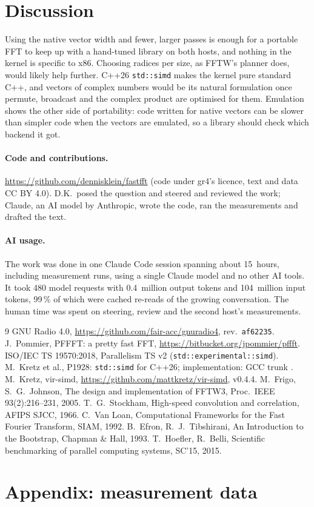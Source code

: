 \documentclass[10pt,a4paper,twocolumn]{article}
\newcommand{\code}[1]{\texttt{#1}}
\begin{document}
\section{Discussion}
Using the native vector width and fewer, larger passes is enough for a portable FFT to keep up with a hand-tuned
library on both hosts, and nothing in the kernel is specific to x86. Choosing radices per size, as FFTW's planner
does, would likely help further. C++26 \code{std::simd} makes the kernel pure standard C++, and vectors of complex
numbers would be its natural formulation once permute, broadcast and the complex product are optimised for them.
Emulation shows the other side of portability: code written for native vectors can be slower than simpler code when
the vectors are emulated, so a library should check which backend it got.

\paragraph{Code and contributions.} \url{https://github.com/dennisklein/fastfft} (code under gr4's licence,
text and data CC BY 4.0). D.K.\ posed the question and steered and reviewed the work; Claude, an AI model by
Anthropic, wrote the code, ran the measurements and drafted the text.

\paragraph{AI usage.} The work was done in one Claude Code session spanning about 15~hours, including measurement runs,
using a single Claude model and no other AI tools. It took 480 model requests with 0.4~million output tokens and
104~million input tokens, 99\,\% of which were cached re-reads of the growing conversation. The human time was spent
on steering, review and the second host's measurements.

\begin{thebibliography}{9}\setlength\itemsep{0pt}\small
{} GNU Radio 4.0, \url{https://github.com/fair-acc/gnuradio4}, rev.\ \code{af62235}.
 J.~Pommier, PFFFT: a pretty fast FFT, \url{https://bitbucket.org/jpommier/pffft}.
 ISO/IEC TS 19570:2018, Parallelism TS v2 (\code{std::experimental::simd}).
 M.~Kretz et al., P1928: \code{std::simd} for C++26; implementation: GCC trunk \code{\TrunkCommit}.
 M.~Kretz, vir-simd, \url{https://github.com/mattkretz/vir-simd}, v0.4.4.
 M.~Frigo, S.~G.~Johnson, The design and implementation of FFTW3, Proc.\ IEEE 93(2):216--231, 2005.
 T.~G.~Stockham, High-speed convolution and correlation, AFIPS SJCC, 1966.
 C.~Van Loan, Computational Frameworks for the Fast Fourier Transform, SIAM, 1992.
 B.~Efron, R.~J.~Tibshirani, An Introduction to the Bootstrap, Chapman \& Hall, 1993.
 T.~Hoefler, R.~Belli, Scientific benchmarking of parallel computing systems, SC'15, 2015.
\end{thebibliography}

\clearpage
\onecolumn
\appendix
\section*{Appendix: measurement data}
\small

\end{document}
